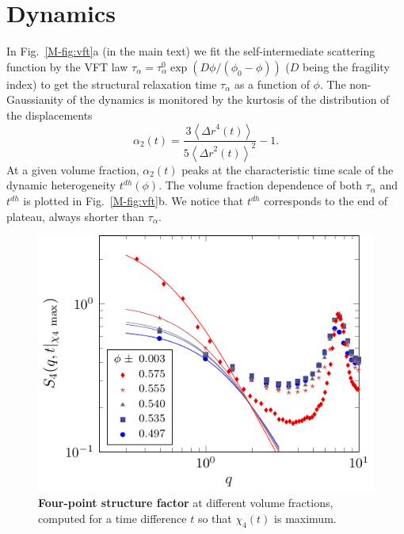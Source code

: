 \documentclass[prl,twocolumn,notitlepage]{revtex4-1}
\begin{document}
\section*{Dynamics}

In Fig.~\ref{M-fig:vft}a (in the main text) we fit the self-intermediate scattering function by the VFT law $\tau_\alpha=\tau_\alpha^0 \exp(D\phi/(\phi_0-\phi))$ ($D$ being the fragility index) to get the structural relaxation time $\tau_\alpha$ as a function of $\phi$. The non-Gaussianity of the dynamics is monitored by the kurtosis of the distribution of the displacements 
\begin{equation}
	\alpha_2(t) = \frac{3 \left\langle {\Delta r}^4(t) \right\rangle}{5 {\left\langle {\Delta r}^2(t) \right\rangle}^2}-1. 
	\label{eq:ng}
\end{equation}
At a given volume fraction, $\alpha_2(t)$ peaks at the characteristic time scale of the dynamic heterogeneity $t^{dh}(\phi)$. The volume fraction dependence of both $\tau_\alpha$ and $t^{dh}$ is plotted in Fig.~\ref{M-fig:vft}b. We notice that $t^{dh}$ corresponds to the end of plateau, always shorter than $\tau_\alpha$.

\begin{figure}
\begin{center}
\includegraphics{generate_figures-figure8.pdf}
\end{center}
\caption{\textbf{Four-point structure factor} at different volume fractions, computed for a time difference $t$ so that $\chi_4(t)$ is maximum.}
	\label{fig:S4}
\end{figure}
\end{document}
